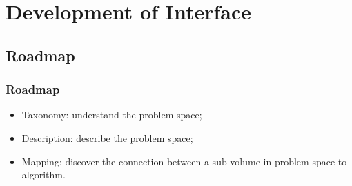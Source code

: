 \documentclass{beamer}
\begin{document}
\section{Development of Interface}
\begin{frame}
\tableofcontents[currentsection,currentsubsection, 
    hideothersubsections, 
    sectionstyle=show/shaded,]
\end{frame}

\subsection{Roadmap}
\begin{frame}
\frametitle{Roadmap}
\begin{itemize}
\item Taxonomy: understand the problem space;
\item Description: describe the problem space;
\item Mapping: discover the connection between a sub-volume in problem space to algorithm.
\end{itemize}
\end{frame}

\end{document}
